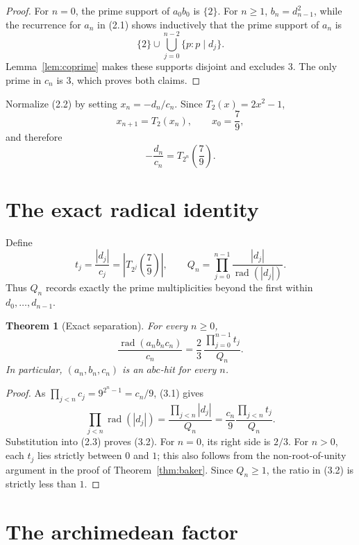 \documentclass[11pt]{article}
\newtheorem{theorem}{Theorem}
\theoremstyle{remark}
\newcommand{\rad}{\operatorname{rad}}
\begin{document}
\begin{proof}
For \(n=0\), the prime support of \(a_0b_0\) is \(\{2\}\).  For \(n\geq1\),
\(b_n=d_{n-1}^2\), while the recurrence for \(a_n\) in (2.1) shows
inductively that the prime support of \(a_n\) is
\[
 \{2\}\cup\bigcup_{j=0}^{n-2}\{p:p\mid d_j\}.
\]
Lemma~\ref{lem:coprime} makes these supports disjoint and excludes \(3\).
The only prime in \(c_n\) is \(3\), which proves both claims.
\end{proof}

Normalize (2.2) by setting \(x_n=-d_n/c_n\).  Since
\(T_2(x)=2x^2-1\),
\[
 x_{n+1}=T_2(x_n),\qquad x_0=\frac79,
\]
and therefore
\[
 -\frac{d_n}{c_n}=T_{2^n}\left(\frac79\right).             \tag{2.4}
\]

\section{The exact radical identity}

Define
\[
 t_j=\frac{|d_j|}{c_j}
     =\left|T_{2^j}\left(\frac79\right)\right|,
 \qquad
 Q_n=\prod_{j=0}^{n-1}\frac{|d_j|}{\rad(|d_j|)}.           \tag{3.1}
\]
Thus \(Q_n\) records exactly the prime multiplicities beyond the first
within \(d_0,\ldots,d_{n-1}\).

\begin{theorem}[Exact separation]\label{thm:separation}
For every \(n\geq0\),
\[
 \boxed{\quad
 \frac{\rad(a_nb_nc_n)}{c_n}
 =\frac23\,\frac{\prod_{j=0}^{n-1}t_j}{Q_n}.
 \quad}                                                    \tag{3.2}
\]
In particular, \((a_n,b_n,c_n)\) is an \(abc\)-hit for every \(n\).
\end{theorem}

\begin{proof}
As \(\prod_{j<n}c_j=9^{2^n-1}=c_n/9\), (3.1) gives
\[
 \prod_{j<n}\rad(|d_j|)
 =\frac{\prod_{j<n}|d_j|}{Q_n}
 =\frac{c_n}{9}\frac{\prod_{j<n}t_j}{Q_n}.
\]
Substitution into (2.3) proves (3.2).  For \(n=0\), its right side is
\(2/3\).  For \(n>0\), each \(t_j\) lies strictly between \(0\) and \(1\);
this also follows from the non-root-of-unity argument in the proof of
Theorem~\ref{thm:baker}.  Since \(Q_n\geq1\), the ratio in (3.2) is
strictly less than \(1\).
\end{proof}

\section{The archimedean factor}
\end{document}

